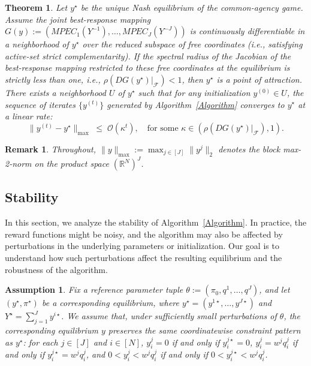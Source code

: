 \documentclass{article}
\newtheorem{assumption}{Assumption}
\newtheorem{remark}{Remark}
\newtheorem{theorem}{Theorem}
\begin{document}
\begin{theorem}
\label{thm:ostrowski_convergence}
Let $y^\star$ be the unique Nash equilibrium of the common-agency game. Assume the joint best-response mapping $G(y) := (MPEC_1(Y^{-1}), \dots, MPEC_J(Y^{-J}))$ is continuously differentiable in a neighborhood of $y^\star$ over the reduced subspace of free coordinates (i.e., satisfying active-set strict complementarity). If the spectral radius of the Jacobian of the best-response mapping restricted to these free coordinates at the equilibrium is strictly less than one, i.e., $\rho(DG(y^\star)|_{\mathcal{F}}) < 1$, then $y^\star$ is a point of attraction. There exists a neighborhood $U$ of $y^\star$ such that for any initialization $y^{(0)} \in U$, the sequence of iterates $\{y^{(t)}\}$ generated by Algorithm~\ref{Algorithm} converges to $y^\star$ at a linear rate:
\[
\|y^{(t)} - y^\star\|_{\max} \;\le\; \mathcal{O}(\kappa^t), \quad \text{for some } \kappa \in (\rho(DG(y^\star)|_{\mathcal{F}}), 1).
\]
\end{theorem}

\begin{remark}
Throughout, $\|y\|_{\max}:=\max_{j\in[J]}\|y^j\|_2$ denotes the block max-2-norm 
on the product space $(\mathbb R^N)^J$.

\subsection{Stability}\label{sec:sensitivity}
\end{remark}

In this section, we analyze the stability of Algorithm~\ref{Algorithm}. In practice, the reward functions might be noisy, and the algorithm may also be affected by perturbations in the underlying parameters or initialization. Our goal is to understand how such perturbations affect the resulting equilibrium and the robustness of the algorithm.

\begin{assumption}\label{ass:sensitivity}
Fix a reference parameter tuple \(\theta := (\pi_0, q^1,\dots,q^J)\), and let \((y^\star,\pi^\star)\) be a corresponding equilibrium, where \(y^\star=(y^{1\star},\dots,y^{J\star})\) and \(Y^\star=\sum_{j=1}^J y^{i\star}\). We assume that, under sufficiently small perturbations of \(\theta\), the corresponding equilibrium \(y\) preserves the same coordinatewise constraint pattern as \(y^\star\): for each \(j\in[J]\) and \(i\in[N]\), \(y_i^j=0\) if and only if \(y_i^{j\star}=0\), \(y_i^j=w^jq_i^j\) if and only if \(y_i^{j\star}=w^jq_i^j\), and \(0<y_i^j<w^jq_i^j\) if and only if \(0<y_i^{j\star}<w^jq_i^j\).
\end{assumption}
\end{document}
